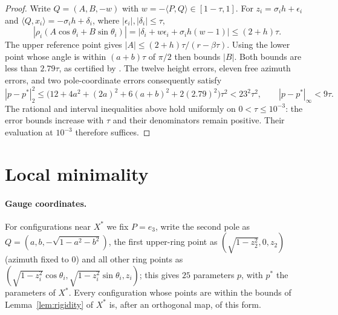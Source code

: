 \documentclass[11pt]{article}
\theoremstyle{definition}
\newcommand{\Xs}{X^{\ast}}
\begin{document}
\begin{proof}
Write $Q=(A,B,-w)$ with $w=-\langle P,Q\rangle\in[1-\tau,1]$.
For $z_i=\sigma_i h+\epsilon_i$ and
$\langle Q,x_i\rangle=-\sigma_i h+\delta_i$, where $|\epsilon_i|,|\delta_i|\le\tau$,
\[
 |\rho_i(A\cos\theta_i+B\sin\theta_i)|
 =|\delta_i+w\epsilon_i+\sigma_i h(w-1)|\le(2+h)\tau.
\]
The upper reference point gives $|A|\le(2+h)\tau/(r-\beta\tau)$.
Using the lower point whose angle is within $(a+b)\tau$ of $\pi/2$ then bounds $|B|$.
Both bounds are less than $2.79\tau$, as certified by .
The twelve height errors, eleven free azimuth errors, and two pole-coordinate errors consequently satisfy
\[
 |p-p^\ast|_2^2\le
 \bigl(12+4a^2+(2a)^2+6(a+b)^2+2(2.79)^2\bigr)\tau^2
 <23^2\tau^2,
 \qquad |p-p^\ast|_\infty<9\tau.
\]
The rational and interval inequalities above hold uniformly on $0<\tau\le10^{-3}$: the error bounds increase with
$\tau$ and their denominators remain positive. Their evaluation at $10^{-3}$ therefore suffices.
\end{proof}

\section{Local minimality}\label{sec:local}
\paragraph{Gauge coordinates.} For configurations near $\Xs$ we fix $P=e_3$, write the second pole as $Q=(a,b,-\sqrt{1-a^2-b^2})$,
the first upper-ring point as $(\sqrt{1-z_2^2},0,z_2)$ (azimuth fixed to $0$) and all other ring points as
$(\sqrt{1-z_i^2}\cos\theta_i,\sqrt{1-z_i^2}\sin\theta_i,z_i)$; this gives $25$ parameters $p$, with $p^\ast$ the parameters of $\Xs$.
Every configuration whose points are within the bounds of Lemma~\ref{lem:rigidity} of $\Xs$ is, after an orthogonal map, of this form.
\end{document}
